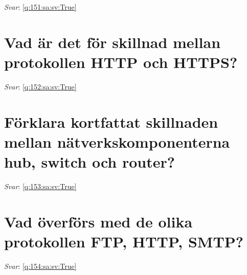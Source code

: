 \documentclass[a4paper,11pt,oneside]{book}
\begin{document}
\begin{sloppypar}
\label{q:151:sa:sv:False}

\vspace{2cm}

\noindent\makebox[\textwidth]{\hrulefill}

\vspace{1cm}

\textit{Svar}: \autoref{q:151:sa:sv:True}



\section{Vad \"ar det f\"or skillnad mellan protokollen HTTP och HTTPS?}

\label{q:152:sa:sv:False}

\vspace{2cm}

\noindent\makebox[\textwidth]{\hrulefill}

\vspace{1cm}

\textit{Svar}: \autoref{q:152:sa:sv:True}



\section{F\"orklara kortfattat skillnaden mellan n\"atverkskomponenterna hub, switch och router?}

\label{q:153:sa:sv:False}

\vspace{2cm}

\noindent\makebox[\textwidth]{\hrulefill}

\vspace{1cm}

\textit{Svar}: \autoref{q:153:sa:sv:True}



\section{Vad \"overf\"ors med de olika protokollen FTP, HTTP, SMTP?}

\label{q:154:sa:sv:False}

\vspace{2cm}

\noindent\makebox[\textwidth]{\hrulefill}

\vspace{1cm}

\textit{Svar}: \autoref{q:154:sa:sv:True}




\end{sloppypar}
\end{document}
